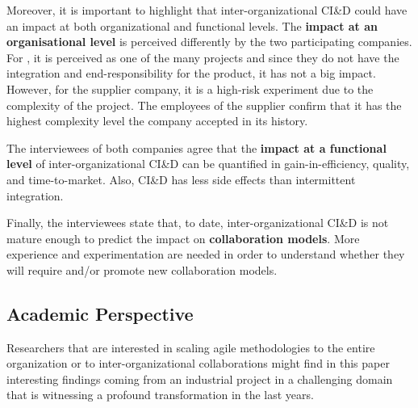 Moreover, it is important to highlight that inter-orga\-ni\-za\-tional CI\&D could have an impact at both organizational and functional levels. 
%
%
The {\bf impact at an organisational level} is perceived differently by the two participating companies. For \company{}, it is perceived as one of the many projects and since they do not have the integration and end-responsibility for the product, it has not a big impact. However, for the supplier company, it is a high-risk experiment due to the complexity of the project. The employees of the supplier confirm that it has the highest complexity level the company accepted in its history.

The interviewees of both companies agree that the {\bf impact at a functional level} of inter-organizational CI\&D %
can be quantified in gain-in-efficiency, quality, and time-to-market. Also, CI\&D has less side effects than intermittent integration.%



Finally, the interviewees state that, to date, inter-organizational CI\&D is not mature enough to predict the impact on {\bf collaboration models}. More experience and experimentation are needed in order to understand whether they will require and/or promote new collaboration models.

\subsection{Academic Perspective}\label{sec:research}


Researchers that are interested in scaling agile methodologies to the entire organization or to inter-organizational collaborations might find in this paper interesting findings coming from an industrial project in a challenging domain that is witnessing a profound transformation in the last years. 

